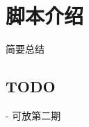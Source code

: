 \documentclass[../main.tex]{subfiles}
\begin{document}
\chapter{脚本介绍}
\vspace{-2cm}

简要总结

\section{TODO}

- 可放第二期
\end{document}

